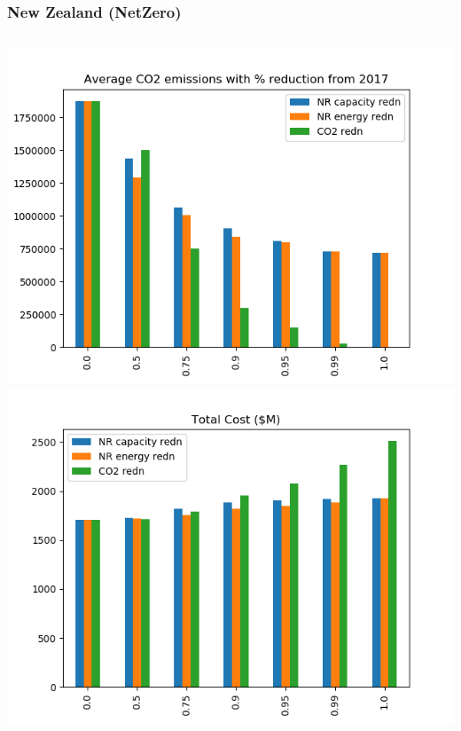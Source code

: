 \documentclass[xcolor=dvipsnames]{beamer}
\begin{document}
\begin{frame}
  \frametitle{New Zealand (NetZero)}
  
  \begin{columns}[T]
    \begin{column}{0.4\linewidth}
      \includegraphics[width=\textwidth]{includes/TotalCarbonv20.png}
      \\
      \includegraphics[width=\textwidth]{includes/TotalCostMv20.png}
    \end{column}


\end{columns}
\end{frame}
\end{document}
